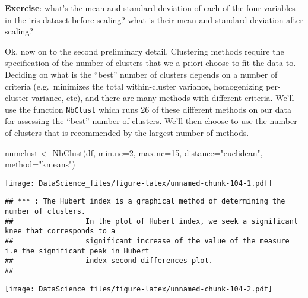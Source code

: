 \documentclass[
]{book}
\newenvironment{Shaded}{\begin{snugshade}}{\end{snugshade}}
\newcommand{\AttributeTok}[1]{\textcolor[rgb]{0.77,0.63,0.00}{#1}}
\newcommand{\DecValTok}[1]{\textcolor[rgb]{0.00,0.00,0.81}{#1}}
\newcommand{\FunctionTok}[1]{\textcolor[rgb]{0.00,0.00,0.00}{#1}}
\newcommand{\NormalTok}[1]{#1}
\newcommand{\OtherTok}[1]{\textcolor[rgb]{0.56,0.35,0.01}{#1}}
\newcommand{\StringTok}[1]{\textcolor[rgb]{0.31,0.60,0.02}{#1}}
\begin{document}
\textbf{Exercise}: what's the mean and standard deviation of each of the four variables in the iris dataset before scaling? what is their mean and standard deviation after scaling?

Ok, now on to the second preliminary detail. Clustering methods require the specification of the number of clusters that we a priori choose to fit the data to. Deciding on what is the ``best'' number of clusters depends on a number of criteria (e.g.~minimizes the total within-cluster variance, homogenizing per-cluster variance, etc), and there are many methods with different criteria. We'll use the function \texttt{NbClust} which runs 26 of these different methods on our data for assessing the ``best'' number of clusters. We'll then choose to use the number of clusters that is recommended by the largest number of methods.

\begin{Shaded}
\begin{Highlighting}[]
\NormalTok{numclust }\OtherTok{\textless{}{-}} \FunctionTok{NbClust}\NormalTok{(df, }\AttributeTok{min.nc=}\DecValTok{2}\NormalTok{, }\AttributeTok{max.nc=}\DecValTok{15}\NormalTok{, }\AttributeTok{distance=}\StringTok{"euclidean"}\NormalTok{, }\AttributeTok{method=}\StringTok{"kmeans"}\NormalTok{)}
\end{Highlighting}
\end{Shaded}

\texttt{[image: DataScience\_files/figure-latex/unnamed-chunk-104-1.pdf]}

\begin{verbatim}
## *** : The Hubert index is a graphical method of determining the number of clusters.
##                 In the plot of Hubert index, we seek a significant knee that corresponds to a 
##                 significant increase of the value of the measure i.e the significant peak in Hubert
##                 index second differences plot. 
## 
\end{verbatim}

\texttt{[image: DataScience\_files/figure-latex/unnamed-chunk-104-2.pdf]}
\end{document}
